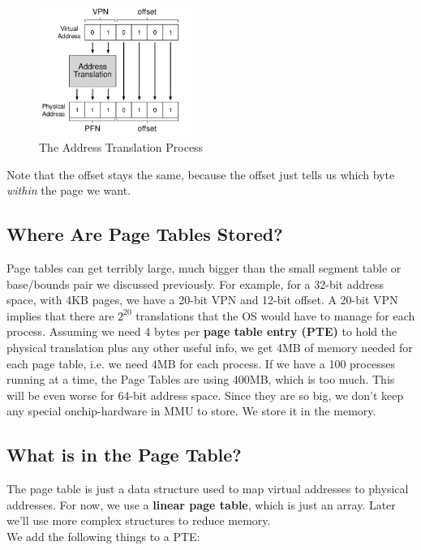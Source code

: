 \begin{figure}[h!]
    \begin{center}
        \includegraphics[width=5cm]{img/183.png}
        \caption{The Address Translation Process}
    \end{center}
\end{figure}

Note that the offset stays the same, because the offset just tells us which
byte \textit{within} the page we want.

\subsection{Where Are Page Tables Stored?}

Page tables can get terribly large, much bigger than the small segment table
or base/bounds pair we discussed previously. For example, for a 32-bit address
space, with 4KB pages, we have a 20-bit VPN and 12-bit offset. A 20-bit VPN
implies that there are $2^20$ translations that the OS would have to manage
for each process. Assuming we need 4 bytes per \textbf{page table entry (PTE)}
to hold the physical translation plus any other useful info, we get 4MB of 
memory needed for each page table, i.e. we need 4MB for each process. If we
have a 100 processes running at a time, the Page Tables are using 400MB, which
is too much. This will be even worse for 64-bit address space. Since they are
so big, we don't keep any special onchip-hardware in MMU to store. We store it
in the memory.

\subsection{What is in the Page Table?}

The page table is just a data structure used to map virtual addresses to
physical addresses. For now, we use a \textbf{linear page table}, which is
just an array. Later we'll use more complex structures to reduce memory.\\

We add the following things to a PTE:


